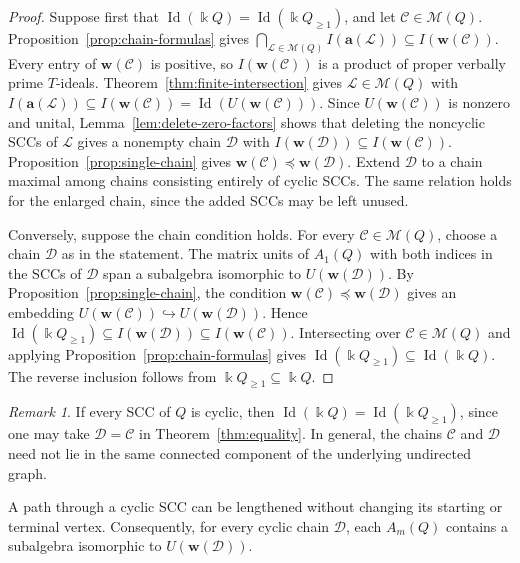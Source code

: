 \documentclass[11pt,reqno]{amsart}
\newcommand{\kk}{\Bbbk}
\newcommand{\Id}{\operatorname{Id}}
\theoremstyle{definition}
\theoremstyle{remark}
\newtheorem{remark}[theorem]{Remark}
\numberwithin{equation}{section}
\begin{document}
\begin{proof}
Suppose first that $\Id(\kk Q)=\Id(\kk Q_{\ge1})$, and let
$\mathcal C\in\mathscr M(Q)$. Proposition~\ref{prop:chain-formulas}
gives
$
\bigcap_{\mathcal L\in\mathscr M(Q)}
 I(\mathbf a(\mathcal L))
 \subseteq I(\mathbf w(\mathcal C))$.
Every entry of $\mathbf w(\mathcal C)$ is positive, so $I(\mathbf w(\mathcal C))$ is a product of proper verbally prime $T$-ideals.
Theorem~\ref{thm:finite-intersection} gives
$\mathcal L\in\mathscr M(Q)$ with
$
 I(\mathbf a(\mathcal L))
 \subseteq I(\mathbf w(\mathcal C))
 =\Id(U(\mathbf w(\mathcal C)))
$.
Since $U(\mathbf w(\mathcal C))$ is nonzero and unital,
Lemma~\ref{lem:delete-zero-factors} shows that deleting the
noncyclic SCCs of $\mathcal L$ gives a nonempty chain
$\mathcal D$ with
$
 I(\mathbf w(\mathcal D))
 \subseteq I(\mathbf w(\mathcal C))$.
Proposition~\ref{prop:single-chain} gives
$\mathbf w(\mathcal C)\preceq\mathbf w(\mathcal D)$.
Extend $\mathcal D$ to a chain maximal among chains consisting
entirely of cyclic SCCs. The same relation holds for the enlarged
chain, since the added SCCs may be left unused.

Conversely, suppose the chain condition holds.
For every $\mathcal C\in\mathscr M(Q)$, choose a chain
$\mathcal D$ as in the statement.
The matrix units of $A_1(Q)$ with both indices in the
SCCs of $\mathcal D$ span a subalgebra isomorphic to
$U(\mathbf w(\mathcal D))$.
By Proposition~\ref{prop:single-chain}, the condition
$\mathbf w(\mathcal C)\preceq\mathbf w(\mathcal D)$ gives an embedding
$U(\mathbf w(\mathcal C))\hookrightarrow U(\mathbf w(\mathcal D))$. Hence
$ \Id(\kk Q_{\ge1})
 \subseteq I(\mathbf w(\mathcal D))
 \subseteq I(\mathbf w(\mathcal C))$.
Intersecting over $\mathcal C\in\mathscr M(Q)$ and applying
Proposition~\ref{prop:chain-formulas} gives
$\Id(\kk Q_{\ge1})\subseteq\Id(\kk Q)$.
The reverse inclusion follows from $\kk Q_{\ge1}\subseteq\kk Q$.
\end{proof}

\begin{remark}
If every SCC of $Q$ is cyclic, then
$\Id(\kk Q)=\Id(\kk Q_{\ge1})$, since one may take
$\mathcal D=\mathcal C$ in Theorem~\ref{thm:equality}.
In general, the chains $\mathcal C$ and $\mathcal D$
need not lie in the same connected component of the
underlying undirected graph.
\end{remark}


A path through a cyclic SCC can be lengthened without changing
its starting or terminal vertex.
Consequently, for every cyclic chain $\mathcal D$,
each $A_m(Q)$ contains a subalgebra isomorphic to
$U(\mathbf w(\mathcal D))$.
\end{document}
